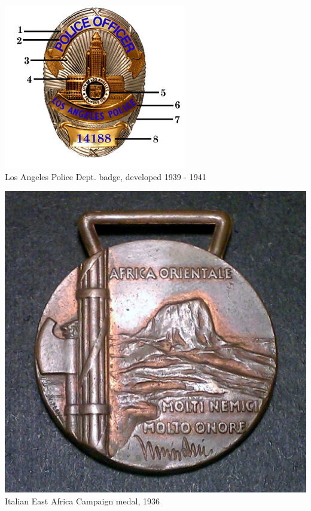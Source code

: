 \begin{frame}
    \centering
    \includegraphics[height=.8\textheight]{img/fasces/badge_description.jpg} \\
    Los Angeles Police Dept. badge, developed 1939 - 1941 \\
\end{frame}
\begin{frame}
    \centering
    \includegraphics[height=.8\textheight]{img/fasces/coin.jpg} \\
    Italian East Africa Campaign medal, 1936 \\
\end{frame}
